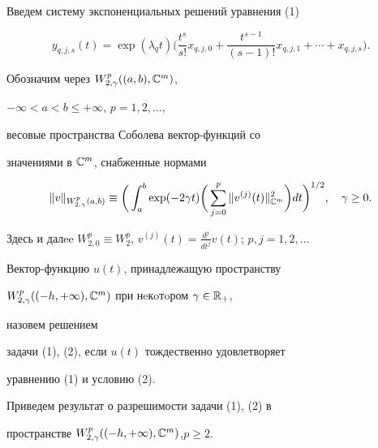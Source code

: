 Введем систему экспоненциальных решений уравнения (1)


\begin{equation} 


y_{q,j,s}(t)=\exp(\lambda_q t)\bigg(\frac{t^s}{s!} 


x_{q,j,0}+\frac{t^{s-1}}{(s-1)!}x_{q,j,1}+\dotsb+ 


x_{q,j,s}\bigg). 


\end{equation} 


Обозначим через $W^p_{2,\gamma}((a,b),\Bbb C^m)$, 


$-\infty<a<b\le+\infty$, $p=1,2,\dotsc$, 


весовые пространства Соболева вектор-функций со 


значениями в $\Bbb C^m$, снабженные нормами 


$$ 


\|v\|_{W^p_{2,\gamma}(a,b)}\equiv\bigg( 


\int^b_a \exp(-2\gamma t)\bigg(\sum^p_{j=0} 


\|v^{(j)}(t)\|^2_{\Bbb C^m}\bigg)d t\bigg)^{1/2},\quad \gamma\ge0. 


$$ 


Здесь и далee $W^p_{2,0}\equiv W^p_2$, $v^{(j)}(t)=\frac{d^j}{d 


t^j}v(t)$; $p,j=1,2,\dotsc$ 


 


\begin{defn} 


Вектор-функцию $u(t)$, принадлежащую пространству 


$W^p_{2,\gamma}((-h,+\infty),\Bbb C^m)$ при нeкoтoром $\gamma\in\Bbb R_+$, 


назовем решением 


задачи (1), (2), если $u(t)$ тождественно удовлетворяет 


уравнению (1) и условию (2). 


\end{defn} 


 


Приведем результат о разрешимости задачи (1), (2) в 


пространстве $W^p_{2,\gamma}((-h,+\infty),\Bbb C^m)$,\linebreak $p\ge2$. 


 


